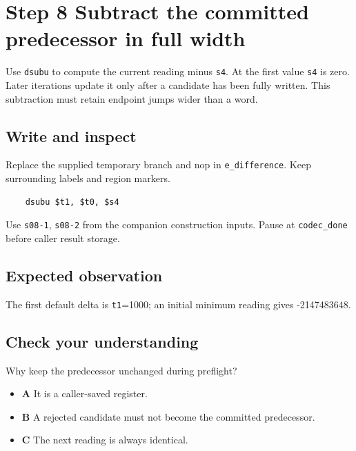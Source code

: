 \section{Step 8 Subtract the committed predecessor in full width}\label{delta-s08}

Use \texttt{dsubu} to compute the current reading minus \texttt{s4}. At the first value \texttt{s4} is zero. Later iterations update it only after a candidate has been fully written. This subtraction must retain endpoint jumps wider than a word.

\subsection{Write and inspect}
Replace the supplied temporary branch and nop in \texttt{e\_difference}. Keep surrounding labels and region markers.

\begin{verbatim}
    dsubu $t1, $t0, $s4
\end{verbatim}
Use \texttt{s08-1}, \texttt{s08-2} from the companion construction inputs. Pause at \texttt{codec\_done} before caller result storage.

\subsection{Expected observation}
The first default delta is \texttt{t1}=1000; an initial minimum reading gives -2147483648.

\subsection{Check your understanding}
Why keep the predecessor unchanged during preflight?

\begin{itemize}
\item \textbf{A} It is a caller-saved register.
\item \textbf{B} A rejected candidate must not become the committed predecessor.
\item \textbf{C} The next reading is always identical.
\end{itemize}
